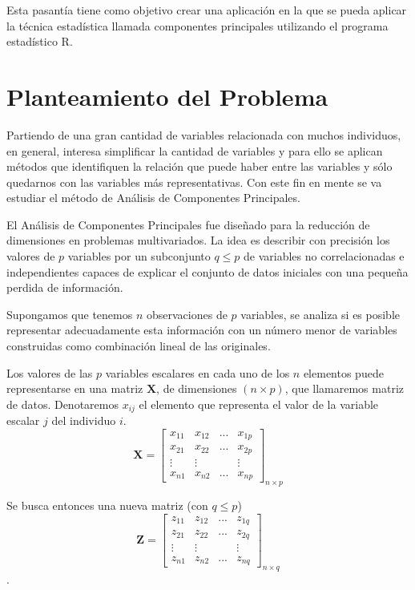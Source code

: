 \documentclass[12pt,letterpaper]{report} %
\begin{document}
Esta pasantía tiene como objetivo crear una aplicación en la que se pueda aplicar la técnica estadística llamada componentes principales utilizando el programa estadístico R.

\section{Planteamiento del Problema}

Partiendo de una gran cantidad de variables relacionada con muchos individuos, en general, interesa simplificar la cantidad de variables y para ello se aplican métodos que identifiquen la relación que puede haber entre las variables y sólo quedarnos con las variables más representativas. Con este fin en mente se va estudiar el método de Análisis de Componentes Principales.

El Análisis de Componentes Principales fue diseñado para la reducción de dimensiones en problemas multivariados. La idea es describir con precisión los valores de $p$ variables por un subconjunto $q\le p$ de variables no correlacionadas e independientes capaces de explicar el conjunto de datos iniciales con una pequeña perdida de información.

Supongamos que tenemos $n$ observaciones de $p$ variables, se analiza si es posible representar adecuadamente esta información con un número menor de variables construidas como combinación lineal de las originales.

Los valores de las $p$ variables escalares en cada uno de los $n$ elementos puede representarse en una matriz $\mathbf{X}$, de dimensiones $(n \times p)$, que llamaremos matriz de datos. Denotaremos $x_{ij}$ el elemento que representa el valor de la variable escalar ${j}$ del individuo ${i}$.
$$
\mathbf{X}=\begin{bmatrix}
x_{11} & x_{12} & ... & x_{1p} \\
x_{21} & x_{22} & ... & x_{2p} \\
\vdots & \vdots &   & \vdots \\
x_{n1} & x_{n2} & ... & x_{np}
\end{bmatrix}_{n\times p}
$$

Se busca entonces una nueva matriz (con $q\le p$)
$$
\mathbf{Z}=\begin{bmatrix}
z_{11} & z_{12} & ... & z_{1q} \\
z_{21} & z_{22} & ... & z_{2q} \\
\vdots & \vdots &   & \vdots \\
z_{n1} & z_{n2} & ... & z_{nq}
\end{bmatrix}_{n\times q}
$$.
\end{document}
